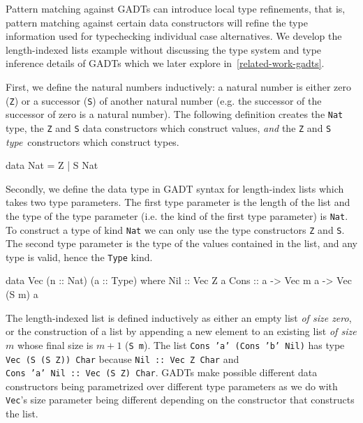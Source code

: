 \documentclass[]{lwnovathesis}
\begin{document}
Pattern matching against GADTs can introduce local type refinements,
that is, pattern matching against certain data constructors will refine the type
information used for typechecking individual case alternatives.
We develop
the length-indexed lists example without discussing the type system and type
inference details of GADTs which we later explore in~\ref{related-work-gadts}.


First, we define the natural numbers inductively: a natural number is either
zero (\texttt{Z}) or a successor (\texttt{S}) of another natural number (e.g.
the successor of the successor of zero is a natural number). The following
definition creates the \texttt{Nat} type, the \texttt{Z} and \texttt{S} data
constructors which construct values, \emph{and} the \texttt{Z} and \texttt{S}
\emph{type} constructors which construct types.
%

\begin{code}
    data Nat = Z | S Nat
  \end{code}


Secondly, we define the data type in GADT syntax for length-index lists which
takes two type parameters. The first type parameter is the length of the list
and the type of the type parameter (i.e. the kind of the first type parameter)
is \texttt{Nat}. To construct a type of kind \texttt{Nat} we can only use the
type constructors \texttt{Z} and \texttt{S}. The second type parameter is the
type of the values contained in the list, and any type is valid, hence the
\texttt{Type} kind.

\begin{code}
    data Vec (n :: Nat) (a :: Type) where
        Nil :: Vec Z a
        Cons :: a -> Vec m a -> Vec (S m) a
\end{code}

The length-indexed list is defined inductively as either an empty list \emph{of
size zero}, or the construction of a list by appending a new element to an
existing list \emph{of size $m$} whose final size is $m+1$ (\texttt{S m}). The
list \texttt{Cons~'a'~(Cons~'b'~Nil)} has type \texttt{Vec~(S~(S~Z))~Char}
because \texttt{Nil~::~Vec~Z~Char} and \texttt{Cons~'a'~Nil~::~Vec~(S~Z)~Char}.
GADTs make possible different data constructors being parametrized over
different type parameters as we do with \texttt{Vec}'s size parameter being
different depending on the constructor that constructs the list.
\end{document}
